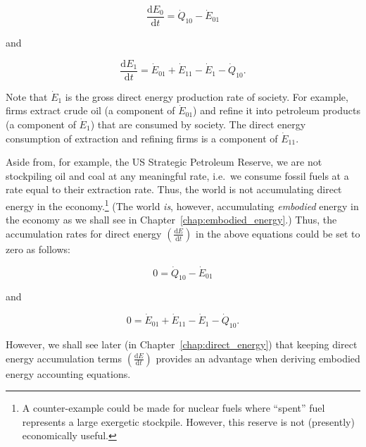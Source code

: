 \begin{equation} \label{eq:dE_0/dt_single_sector}
	\frac{\mathrm{d}E_0}{\mathrm{d}t} 
	= \dot{Q}_{10} 
	- \dot{E}_{01}
\end{equation}

\noindent and

\begin{equation} \label{eq:dE_1/dt_single_sector}
	\frac{\mathrm{d}E_{1}}{\mathrm{d}t} 
	= \dot{E}_{01} 
	+ \dot{E}_{11}
	- \dot{E}_{1}
	- \dot{Q}_{10}.
\end{equation}

Note that $\dot{E}_{1}$ is the gross direct energy production rate
of society. 
For example, firms extract crude oil (a component of $\dot{E}_{01}$) 
and refine it into petroleum products (a component of $\dot{E}_{1}$)
that are consumed by society.
The direct energy consumption of extraction and refining firms 
is a component of $\dot{E}_{11}$.

Aside from, for example, the US 
Strategic Petroleum Reserve, 
we are not stockpiling oil and coal at any meaningful rate, 
i.e.\ we consume fossil fuels at a rate equal to their extraction rate. 
Thus, the world is not accumulating direct energy 
in the economy.\footnote{A counter-example could be made 
for nuclear fuels where ``spent'' fuel represents a large exergetic stockpile. 
However, this reserve is not (presently) economically useful.} 
(The world \emph{is}, however, 
accumulating \emph{embodied} energy
in the economy as we shall see 
in Chapter~\ref{chap:embodied_energy}.) 
Thus, the accumulation rates for direct energy 
$\left( \frac{\mathrm{d}E}{\mathrm{d}t} \right)$ in the above equations 
could be set to zero as follows:

\begin{equation} \label{eq:biosphere_direct_energy_steady_state}
	0 
	= \dot{Q}_{10} 
	- \dot{E}_{01}
\end{equation}

\noindent and

\begin{equation} \label{eq:single_sector_direct_energy_steady_state}
	0 
	= \dot{E}_{01} 
	+ \dot{E}_{11}
	- \dot{E}_{1} 
	- \dot{Q}_{10}.
\end{equation}

\noindent{}However, we shall see later (in Chapter~\ref{chap:direct_energy}) 
that keeping direct energy accumulation terms
$\left( \frac{\mathrm{d}E}{\mathrm{d}t} \right)$ 
provides an advantage when deriving embodied energy accounting equations.


